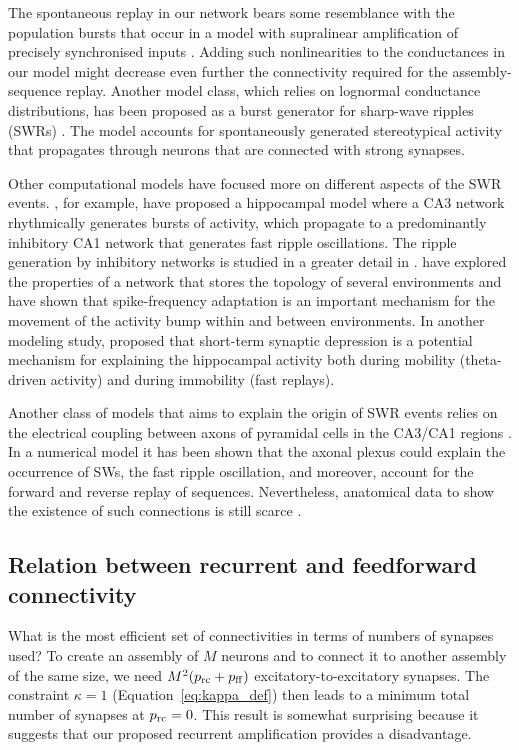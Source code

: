    The spontaneous replay in our network bears some resemblance with the
    population bursts that occur in a model with supralinear amplification of
    precisely synchronised inputs \citep{Memmesheimer2010, Jahnke2015}. Adding
    such nonlinearities to the conductances in our model might decrease even
    further the connectivity required for the assembly-sequence replay. Another
    model class, which relies on lognormal conductance distributions, has been
    proposed as a burst generator for sharp-wave ripples (SWRs)
    \citep{Omura2015}. The model accounts for spontaneously generated
    stereotypical activity that propagates through neurons that are connected
    with strong synapses.

    Other computational models have focused more on different aspects of the
    SWR events. \cite{Taxidis2012}, for example, have proposed a
    hippocampal model where a CA3 network rhythmically generates bursts of
    activity, which propagate to a predominantly inhibitory CA1 network that
    generates fast ripple oscillations. The ripple generation by inhibitory
    networks is studied in a greater detail in
    \cite{Malerba2016}. \cite{Azizi2013} have explored the
    properties of a network that stores the topology of several environments
    and have shown that spike-frequency adaptation is an important mechanism
    for the movement of the activity bump within and between environments. In
    another modeling study, \cite{Romani2015} proposed that
    short-term synaptic depression is a potential mechanism for explaining the
    hippocampal activity both during mobility (theta-driven activity) and
    during immobility (fast replays).

    Another class of models that aims to explain the origin of SWR events
    relies on the electrical coupling between axons of pyramidal cells in the
    CA3/CA1 regions \citep{Draguhn1998, Schmitz2001, Traub2012}. In a numerical
    model \citep{Vladimirov2013} it has been shown that the axonal plexus could
    explain the occurrence of SWs, the fast ripple oscillation, and moreover,
    account for the forward and reverse replay of sequences. Nevertheless,
    anatomical data to show the existence of such connections is still scarce
    \citep{Hamzei2007}.

  \subsection{Relation between recurrent and feedforward connectivity} What is
    the most efficient set of connectivities in terms of numbers of synapses
    used? To create an assembly of $M$ neurons and to connect it to another
    assembly of the same size, we need $M^2 (p_{\rm rc} + p_{\rm ff})$
    excitatory-to-excitatory synapses. The constraint $\kappa =1$
    (Equation~\ref{eq:kappa_def}) then leads to a minimum total number of synapses at
    $p_{\rm rc} = 0$. This result is somewhat surprising because it suggests
    that our proposed recurrent amplification provides a disadvantage.

